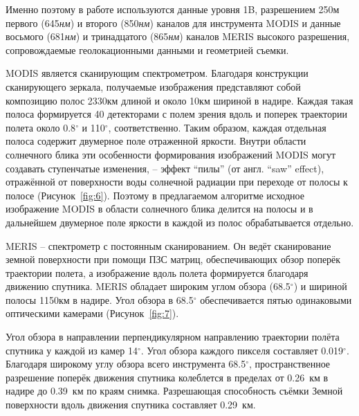 Именно поэтому в работе используются данные уровня 1B, разрешением 250м первого (645\textit{нм}) и второго (850\textit{нм}) каналов для инструмента MODIS и данные восьмого (681\textit{нм}) и тринадцатого (865\textit{нм}) каналов MERIS высокого разрешения, сопровождаемые геолокационными данными и геометрией съемки.

MODIS является сканирующим спектрометром. Благодаря конструкции сканирующего зеркала, получаемые изображения представляют собой композицию полос 2330км длиной и около 10км шириной в надире. Каждая такая полоса формируется 40 детекторами с полем зрения вдоль и поперек траектории полета около 0.8${}^\circ$ и 110${}^\circ$, соответственно. Таким образом, каждая отдельная полоса содержит двумерное поле отраженной яркости. Внутри области солнечного блика эти особенности формирования изображений MODIS могут создавать ступенчатые изменения, -- эффект ``пилы'' (от англ. ``saw'' effect), отражённой от поверхности воды солнечной радиации при переходе от полосы к полосе (Рисунок~\ref{fig:6}). Поэтому в предлагаемом алгоритме исходное изображение MODIS в области солнечного блика делится на полосы и в дальнейшем двумерное поле яркости в каждой из полос обрабатывается отдельно.

MERIS -- спектрометр с постоянным сканированием. Он ведёт сканирование земной поверхности при помощи ПЗС матриц, обеспечивающих обзор поперёк траектории полета, а изображение вдоль полета формируется благодаря движению спутника. MERIS обладает широким углом обзора (68.5${}^\circ$) и шириной полосы 1150км в надире. Угол обзора в 68.5${}^\circ$ обеспечивается пятью одинаковыми оптическими камерами (Рисунок~\ref{fig:7}).

Угол обзора в направлении перпендикулярном направлению траектории полёта спутника у каждой из камер 14${}^\circ$. Угол обзора каждого пикселя составляет 0.019${}^\circ$. Благодаря широкому углу обзора всего инструмента 68.5${}^\circ$, пространственное разрешение поперёк движения спутника колеблется в пределах от 0.26~км в надире до 0.39~км по краям снимка. Разрешающая способность съёмки Земной поверхности вдоль движения спутника составляет 0.29~км.


